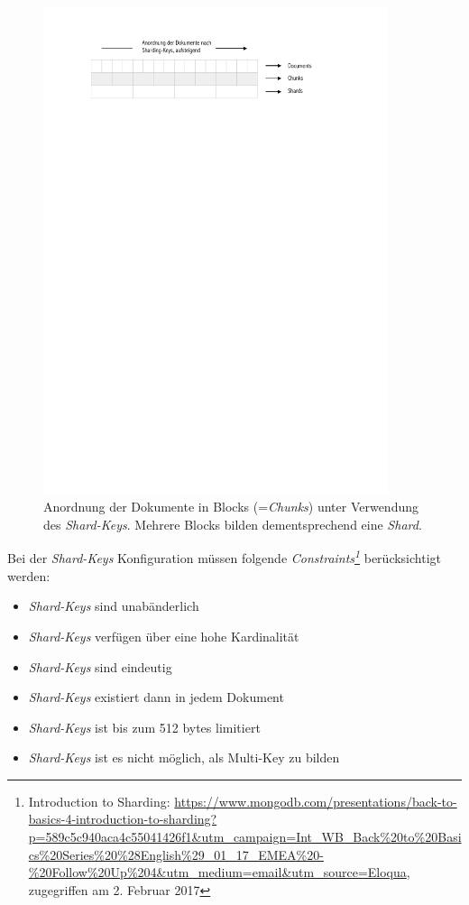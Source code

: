 \begin{figure}[H]
\centering
 \includegraphics[trim = 25mm 240mm 40mm 20mm, clip, width=0.9\textwidth]{resources/replicaSet/sharding-keys}
\caption[Anordnung der Dokumente in Blocks (=\textit{Chunks}) unter Verwendung des \textit{Shard-Keys}. Mehrere Blocks bilden dementsprechend eine \textit{Shard}.]{Anordnung der Dokumente in Blocks (=\textit{Chunks}) unter Verwendung des \textit{Shard-Keys}. Mehrere Blocks bilden dementsprechend eine \textit{Shard}.}
\label{img:shardKeys}
\end{figure}

Bei der \textit{Shard-Keys} Konfiguration müssen folgende \textit{Constraints\footnote{Introduction to Sharding: \url{https://www.mongodb.com/presentations/back-to-basics-4-introduction-to-sharding?p=589c5c940aca4c55041426f1&utm_campaign=Int_WB_Back\%20to\%20Basics\%20Series\%20\%28English\%29_01_17_EMEA\%20-\%20Follow\%20Up\%204&utm_medium=email&utm_source=Eloqua}, zugegriffen am 2. Februar 2017}} berücksichtigt werden:
\begin{itemize}
\item \textit{Shard-Keys} sind unabänderlich
\item \textit{Shard-Keys} verfügen über eine hohe Kardinalität
\item \textit{Shard-Keys} sind eindeutig
\item \textit{Shard-Keys} existiert dann in jedem Dokument
\item \textit{Shard-Keys} ist bis zum 512 bytes limitiert
\item \textit{Shard-Keys} ist es nicht möglich, als Multi-Key zu bilden
\end{itemize}

